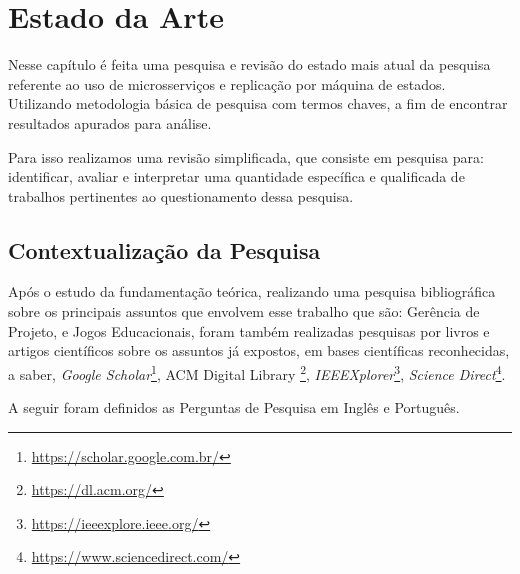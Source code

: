 \chapter{Estado da Arte}

Nesse capítulo é feita uma pesquisa e revisão do estado mais atual da pesquisa referente ao uso de microsserviços e replicação por máquina de estados. Utilizando metodologia básica de pesquisa com termos chaves, a fim de encontrar resultados apurados para análise.

Para isso realizamos uma revisão simplificada, que consiste em pesquisa para: identificar, avaliar e interpretar uma quantidade específica e qualificada de trabalhos pertinentes ao questionamento dessa pesquisa.

\section{Contextualização da Pesquisa}

Após o estudo da fundamentação teórica, realizando uma pesquisa bibliográfica sobre os principais assuntos que envolvem esse trabalho que são: Gerência de Projeto, e Jogos Educacionais, foram também realizadas pesquisas por livros e artigos científicos sobre os assuntos já expostos, em bases científicas reconhecidas, a saber, \textit{Google Scholar}\footnote{\url{https://scholar.google.com.br/}}, ACM Digital Library \footnote{\url{https://dl.acm.org/}}, \textit{IEEEXplorer}\footnote{\url{https://ieeexplore.ieee.org/}}, \textit{Science Direct}\footnote{\url{https://www.sciencedirect.com/}}.

A seguir foram definidos as Perguntas de Pesquisa em Inglês e Português.

\begin{table}[!htb]
\caption{Criação e idealização da pesquisa}
\begin{center}
{
\footnotesize
{}
}
\end{center}
\label{tab:idealizacao}
\end{table}

